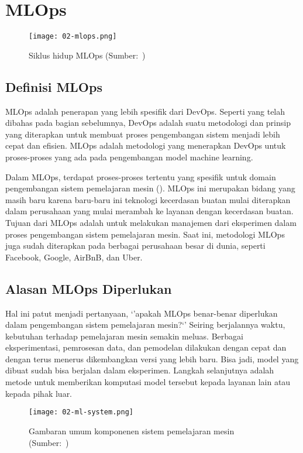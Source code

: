 \section{MLOps}

\begin{figure}[h]
  \centering
  \texttt{[image: 02-mlops.png]}
  \caption{Siklus hidup MLOps (Sumber:~\cite{mlops})}
\end{figure}

\subsection{Definisi MLOps}

MLOps adalah penerapan yang lebih spesifik dari DevOps. 
Seperti yang telah dibahas pada bagian sebelumnya, DevOps adalah suatu metodologi dan prinsip yang diterapkan untuk membuat proses pengembangan sistem menjadi lebih cepat dan efisien.
MLOps adalah metodologi yang menerapkan DevOps untuk proses-proses yang ada pada pengembangan model machine learning.

Dalam MLOps, terdapat proses-proses tertentu yang spesifik untuk domain pengembangan sistem pemelajaran mesin (\cite{mlops}).\@
MLOps ini merupakan bidang yang masih baru karena baru-baru ini teknologi kecerdasan buatan mulai diterapkan dalam perusahaan yang mulai merambah ke layanan dengan kecerdasan buatan.
Tujuan dari MLOps adalah untuk melakukan manajemen dari eksperimen dalam proses pengembangan sistem pemelajaran mesin.
Saat ini, metodologi MLOps juga sudah diterapkan pada berbagai perusahaan besar di dunia, seperti Facebook, Google, AirBnB, dan Uber.

\subsection{Alasan MLOps Diperlukan}

Hal ini patut menjadi pertanyaan, `'apakah MLOps benar-benar diperlukan dalam pengembangan sistem pemelajaran mesin?`'
Seiring berjalannya waktu, kebutuhan terhadap pemelajaran mesin semakin meluas.
Berbagai eksperimentasi, pemrosesan data, dan pemodelan dilakukan dengan cepat dan dengan terus menerus dikembangkan versi yang lebih baru.
Bisa jadi, model yang dibuat sudah bisa berjalan dalam eksperimen.
Langkah selanjutnya adalah metode untuk memberikan komputasi model tersebut kepada layanan lain atau kepada pihak luar.

\begin{figure}[ht]
  \centering
  \texttt{[image: 02-ml-system.png]}
  \captionsetup{justification=centering}
  \caption{Gambaran umum komponenen sistem pemelajaran mesin (Sumber:~\cite{NIPS2015_86df7dcf})}\label{fig:ml-system}
\end{figure}

